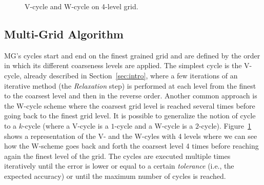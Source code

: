  



\begin{figure}[hbt]
 \resizebox{\linewidth}{!}{
    
 }
 \caption{V-cycle and W-cycle on 4-level grid.}
 \label{fig.cycles}
\end{figure}

\subsection{Multi-Grid Algorithm}
\label{sec:algo}

MG's cycles start and end on the finest grained grid and are defined by the
order in which its different coarseness levels are applied.  The simplest cycle
is the V-cycle, already described in Section~\ref{sec:intro}, where a few
iterations of an iterative method (the \textit{Relaxation} step) is performed
at each level from the finest to the coarsest level and then in the reverse
order.  Another common approach is the W-cycle scheme where the coarsest grid
level is reached several times before going back to the finest grid level.  It is
possible to generalize the notion of cycle to a $k$-cycle (where a V-cycle is a
$1$-cycle and a W-cycle is a $2$-cycle).  Figure~\ref{fig.cycles} shows a
representation of the V- and the W-cyles with 4 levels where we can see how the
W-scheme goes back and forth the coarsest level 4 times before reaching again
the finest level of the grid.  The cycles are executed multiple times
iteratively until the error is lower or equal to a certain \emph{tolerance}
(i.e., the expected accuracy) or until the maximum number of cycles is reached.


